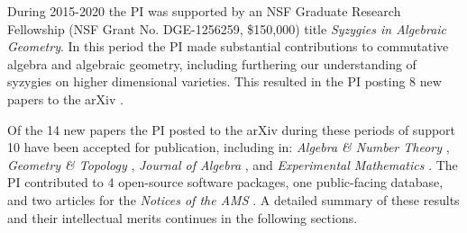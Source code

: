 \documentclass[11pt,reqno]{amsart}
\theoremstyle{remark}
\begin{document}
During 2015-2020 the PI was supported by an NSF Graduate Research Fellowship (NSF Grant No. DGE-1256259, \$150,000) title \textit{Syzygies in Algebraic Geometry}. In this period the PI made substantial contributions to commutative algebra and algebraic geometry, including furthering our understanding of syzygies on higher dimensional varieties. This resulted in the PI posting 8 new papers to the arXiv \cite{ABLS20,BBBKR17,bruceErman19,bruceLi20,BEGY20,BEGY21,bruce24,bruce22}.

Of the 14 new papers the PI posted to the arXiv during these periods of support 10 have been accepted for publication, including in: \textit{Algebra \& Number Theory} \cite{bruceErman19}, \textit{Geometry \& Topology} \cite{BBCMMW24}, \textit{Journal of Algebra} \cite{BCEGLY22}, and \textit{Experimental Mathematics} \cite{BEGY20}. The PI contributed to 4 open-source software packages, one public-facing database, and two articles for the \textit{Notices of the AMS} \cite{BBB21,bruceNotices22}. A  detailed summary of these results and their intellectual merits continues in the following sections. 
\end{document}
